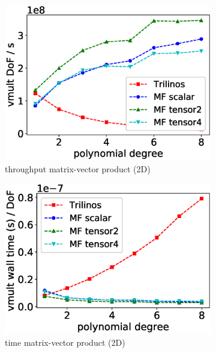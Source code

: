 \documentclass[AMA,STIX1COL]{WileyNJD-v2}
\begin{document}
\begin{figure}
  \centering
  \begin{subfigure}[b]{0.32\textwidth}
      \centering
      \includegraphics[width=\textwidth]{IWR_newest_patched_throughput2d.eps}
      \caption{throughput matrix-vector product (2D)}
  \end{subfigure}
  \begin{subfigure}[b]{0.32\textwidth}
      \centering
      \includegraphics[width=\textwidth]{IWR_newest_patched_timing2d.eps}
      \caption{time matrix-vector product (2D)}
      \label{fig:benchmark_miehe_IWR_vmult2}
  \end{subfigure}
  \begin{subfigure}[b]{0.32\textwidth}
      \centering

\end{subfigure}
\end{figure}
\end{document}
